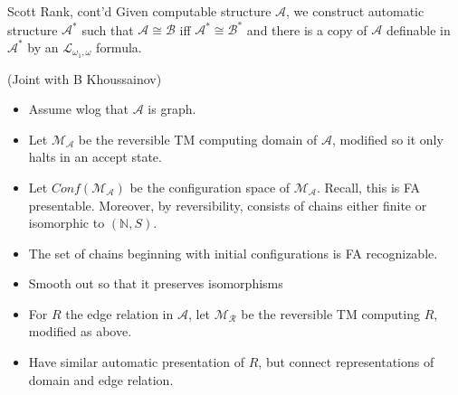 \documentclass[style=fyma
 ]{powerdot}
\begin{document}
\begin{slide}{Scott Rank, cont'd}
Given computable structure $\mathcal{A}$, we construct automatic structure $\mathcal{A}^{*}$ such that $\mathcal{A} \cong \mathcal{B}$ iff $\mathcal{A}^{*} \cong \mathcal{B}^{*}$ and there is a copy of $\mathcal{A}$ definable in $\mathcal{A}^{*}$ by an $\mathcal{L}_{\omega_{1}, \omega}$ formula.

(Joint with B Khoussainov)  
\pause
\vspace{-5pt}
  \begin{itemize}
    \item Assume wlog that $\mathcal{A}$ is graph.
    \item Let $\mathcal{M}_{\mathcal{A}}$ be the reversible TM computing domain of $\mathcal{A}$, modified so it only halts in an accept state.
    \item Let $Conf(\mathcal{M}_{\mathcal{A}})$ be the configuration space of $\mathcal{M}_{\mathcal{A}}$.  Recall, this is FA presentable.  Moreover, by reversibility, consists of chains either finite or isomorphic to $(\mathbb{N}, S)$.
    \item The set of chains beginning with initial configurations is FA recognizable.
    \item Smooth out so that it preserves isomorphisms
    \item For $R$ the edge relation in $\mathcal{A}$, let $\mathcal{M}_{\mathcal{R}}$ be the reversible TM computing $R$, modified as above.
    \item Have similar automatic presentation of $R$, but connect representations of domain and edge relation.
  \end{itemize}
\end{slide}
\end{document}
